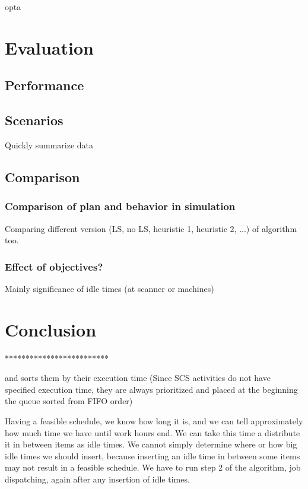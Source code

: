\documentclass{ctuthesis}
\begin{document}
opta


\chapter{Evaluation}
\label{ch:Evaluation}
\section{Performance}
\section{Scenarios}
Quickly summarize data 
\section{Comparison}
\subsection{Comparison of plan and behavior in simulation}
Comparing different version (LS, no LS, heuristic 1, heuristic 2, ...) of algorithm too.
\subsection{Effect of objectives?}
Mainly significance of idle times (at scanner or machines)
\chapter{Conclusion}






*************************

 and sorts them by their execution time (Since SCS activities do not have specified execution time, they are always prioritized and placed at the beginning the queue sorted from FIFO order)
 
 

Having a feasible schedule, we know how long it is, and we can tell approximately how much time we have until work hours end. We can take this time a distribute it in between items as idle times. We cannot simply determine where or how big idle times we should insert, because inserting an idle time in between some items may not result in a feasible schedule. We have to run step 2 of the algorithm, job dispatching, again after any insertion of idle times.
\end{document}
